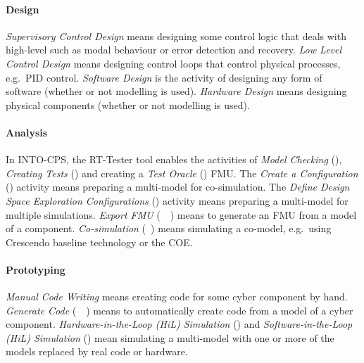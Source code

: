 \paragraph{Design}

\emph{Supervisory Control Design} means designing some control logic that deals with high-level such as modal behaviour or error detection and recovery. \emph{Low Level Control Design} means designing control loops that control physical processes, e.g.\ PID control. \emph{Software Design} is the activity of designing any form of software (whether or not modelling is used). \emph{Hardware Design} means designing physical components (whether or not modelling is used).

\paragraph{Analysis}

In INTO-CPS, the RT-Tester tool enables the activities of \emph{Model Checking} (\RTTester), \emph{Creating Tests} (\RTTester) and creating a \emph{Test Oracle} (\RTTester) FMU. The \emph{Create a Configuration} (\INTOCPS) activity means preparing a multi-model for co-simulation. The \emph{Define Design Space Exploration Configurations} (\INTOCPS) activity means preparing a multi-model for multiple simulations. \emph{Export FMU} (\Overture~\TwentySim~\OpenModelica)  means to generate an FMU from a model of a component. \emph{Co-simulation} (\Crescendo~\INTOCPS) means simulating a co-model, e.g.\ using Crescendo baseline technology or the COE.

\paragraph{Prototyping}

\emph{Manual Code Writing} means creating code for some cyber component by hand. \emph{Generate Code} (\Overture~\TwentySim~\OpenModelica) means to automatically create code from a model of a cyber component. \emph{Hardware-in-the-Loop (HiL) Simulation} (\INTOCPS) and \emph{Software-in-the-Loop (HiL) Simulation} (\INTOCPS) mean simulating a multi-model with one or more of the models replaced by real code or hardware.


